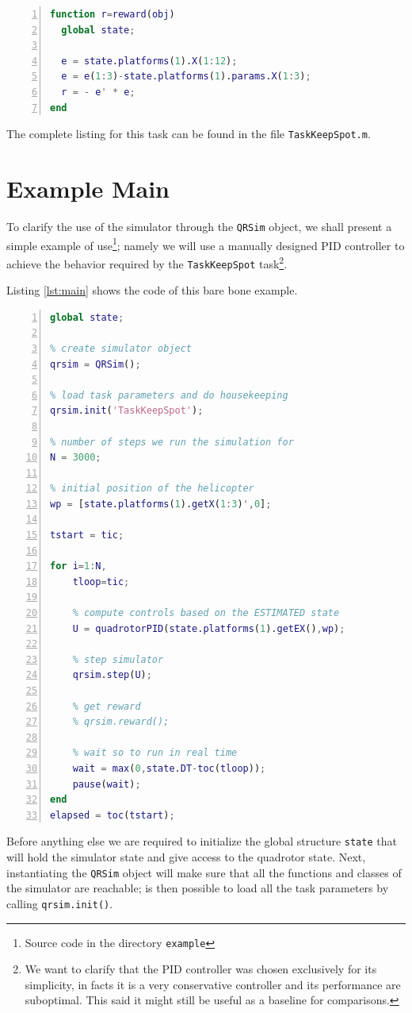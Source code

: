 \documentclass[a4paper,11pt]{report}
\newcommand{\snamettt}{\texttt{QRSim}\xspace}
\begin{document}
\begin{lstlisting}[float=ht!bp,caption=TaskKeepSpot reward() method,language=Matlab,frame=lines,label=lst:reward,numbers=left,basicstyle=\small]
function r=reward(obj)
  global state;

  e = state.platforms(1).X(1:12);
  e = e(1:3)-state.platforms(1).params.X(1:3);
  r = - e' * e; 
end
\end{lstlisting}
The complete listing for this task can be found in the file \texttt{TaskKeepSpot.m}.  

\section{Example Main}
To clarify the use of the simulator through the \snamettt object, we shall present a simple example of use\footnote{Source code in the directory \texttt{example}}; namely we will use a manually designed PID controller to achieve the behavior required by the \texttt{TaskKeepSpot} task\footnote{We want to clarify that the PID controller was chosen exclusively for its simplicity, in facts it is a very conservative controller and its performance are suboptimal. This said it might still be useful as a baseline for comparisons.}.

Listing \ref{lst:main} shows the code of this bare bone example. 

\begin{lstlisting}[float=ht!bp,caption=main script,language=Matlab,frame=lines,label=lst:main,numbers=left,basicstyle=\small]
global state;

% create simulator object
qrsim = QRSim();

% load task parameters and do housekeeping
qrsim.init('TaskKeepSpot');

% number of steps we run the simulation for
N = 3000;

% initial position of the helicopter
wp = [state.platforms(1).getX(1:3)',0];

tstart = tic;

for i=1:N,
    tloop=tic;

    % compute controls based on the ESTIMATED state 
    U = quadrotorPID(state.platforms(1).getEX(),wp);

    % step simulator
    qrsim.step(U);
    
    % get reward
    % qrsim.reward();
    
    % wait so to run in real time
    wait = max(0,state.DT-toc(tloop));
    pause(wait);
end
elapsed = toc(tstart);
\end{lstlisting}
Before anything else we are required to initialize the global structure \texttt{state} that will hold the simulator state and give access to the quadrotor state. Next, instantiating the \snamettt object will make sure that all the functions and classes of the simulator are reachable; is then possible to load all the task parameters by calling \texttt{qrsim.init()}. 
\end{document}
